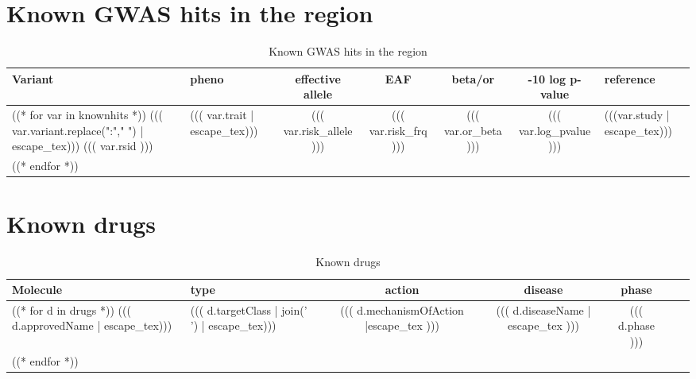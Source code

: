 \documentclass{article}
\begin{document}
\newpage

\section{ Known GWAS hits in the region}
\begin{longtable}{ >{\RaggedRight}p{3cm}|L{3cm}|c|c|c|c|>{\RaggedRight}p{3cm} }
\caption{ Known GWAS hits in the region }\\
Variant & pheno & effective allele & EAF & beta/or & -10 log p-value & reference \\
\hline
((* for var in knownhits *))
((( var.variant.replace(":"," ") | escape_tex))) \newline ((( var.rsid ))) & ((( var.trait | escape_tex))) & ((( var.risk_allele ))) & ((( var.risk_frq ))) & ((( var.or_beta ))) & ((( var.log_pvalue ))) & (((var.study | escape_tex))) \\
((* endfor *))
\end{longtable}



\newpage

\section{ Known drugs }
\begin{longtable}{ >{\RaggedRight}p{3cm}|L{3cm}|c|c|c|c|>{\RaggedRight}p{3cm} }
\caption{ Known drugs }\\
Molecule & type & action & disease & phase \\
\hline
((* for d in drugs *))
((( d.approvedName | escape_tex))) & ((( d.targetClass | join(' ') | escape_tex))) & ((( d.mechanismOfAction |escape_tex ))) & ((( d.diseaseName | escape_tex ))) & ((( d.phase ))) \\
((* endfor *))
\end{longtable}
\endgroup
\end{document}
